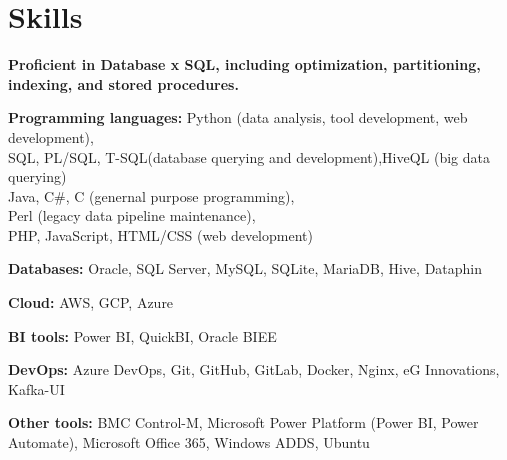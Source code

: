 \section{Skills}

\begin{entrylist}[itemsep=0.5ex]
\item \textbf{Proficient in Database x SQL, including optimization, partitioning, indexing, and stored procedures.}
\item \textbf{Programming languages:}
    Python (data analysis, tool development, web development),\\
    SQL, PL/SQL, T-SQL(database querying and development),HiveQL (big data querying)\\
    Java, C\#, C (genernal purpose programming),\\
    Perl (legacy data pipeline maintenance),\\
    PHP, JavaScript, HTML/CSS (web development)

\item \textbf{Databases:} Oracle, SQL Server, MySQL, SQLite, MariaDB, Hive, Dataphin

\item \textbf{Cloud:} AWS, GCP, Azure

\item \textbf{BI tools:} Power BI, QuickBI, Oracle BIEE

\item \textbf{DevOps:} Azure DevOps, Git, GitHub, GitLab, Docker, Nginx, eG Innovations, Kafka-UI

\item \textbf{Other tools:} BMC Control-M, Microsoft Power Platform (Power BI, Power Automate), Microsoft Office 365, Windows ADDS, Ubuntu

\end{entrylist}
